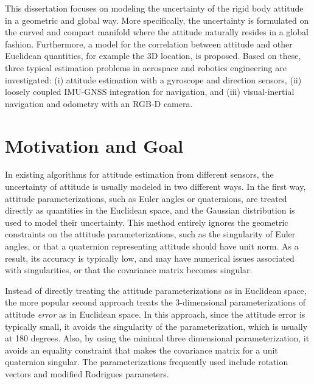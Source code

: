 This dissertation focuses on modeling the uncertainty of the rigid body attitude in a geometric and global way.
More specifically, the uncertainty is formulated on the curved and compact manifold where the attitude naturally resides in a global fashion.
Furthermore, a model for the correlation between attitude and other Euclidean quantities, for example the 3D location, is proposed.
Based on these, three typical estimation problems in aerospace and robotics engineering are investigated: (i) attitude estimation with a gyroscope and direction sensors, (ii) loosely coupled IMU-GNSS integration for navigation, and (iii) visual-inertial navigation and odometry with an RGB-D camera. 

\section{Motivation and Goal}

In existing algorithms for attitude estimation from different sensors, the uncertainty of attitude is usually modeled in two different ways.
In the first way, attitude parameterizations, such as Euler angles or quaternions, are treated directly as quantities in the Euclidean space, and the Gaussian distribution is used to model their uncertainty.
This method entirely ignores the geometric constraints on the attitude parameterizations, such as the singularity of Euler angles, or that a quaternion representing attitude should have unit norm.
As a result, its accuracy is typically low, and may have numerical issues associated with singularities, or that the covariance matrix becomes singular.

Instead of directly treating the attitude parameterizations as in Euclidean space, the more popular second approach treats the 3-dimensional parameterizations of attitude \textit{error} as in Euclidean space.
In this approach, since the attitude error is typically small, it avoids the singularity of the parameterization, which is usually at 180 degrees.
Also, by using the minimal three dimensional parameterization, it avoids an equality constraint that makes the covariance matrix for a unit quaternion singular.
The parameterizations frequently used include rotation vectors and modified Rodrigues parameters.

